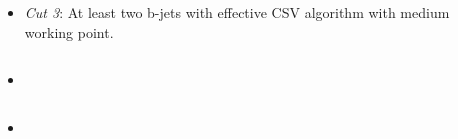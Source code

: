 \begin{frame}{}
\vspace{-.2cm}

\begin{columns}
\begin{column}{.50\textwidth}
\begin{block}{}
\begin{itemize}\scriptsize
\item \textit{Cut 3}: At least two b-jets with effective CSV algorithm with medium working point.
\end{itemize}
\end{block}
\end{column}

\begin{column}{.50\textwidth}

\end{column}
\end{columns}

\end{frame}

\begin{frame}{}
\vspace{-.2cm}

\begin{columns}
\begin{column}{.50\textwidth}
\begin{block}{}
\begin{itemize}\scriptsize
\item 
\end{itemize}
\end{block}
\end{column}

\begin{column}{.50\textwidth}

\end{column}
\end{columns}

\end{frame}

\begin{frame}{}
\vspace{-.2cm}

\begin{columns}
\begin{column}{.50\textwidth}
\begin{block}{}
\begin{itemize}\scriptsize
\item 
\end{itemize}
\end{block}
\end{column}

\begin{column}{.50\textwidth}

\end{column}
\end{columns}

\end{frame}

